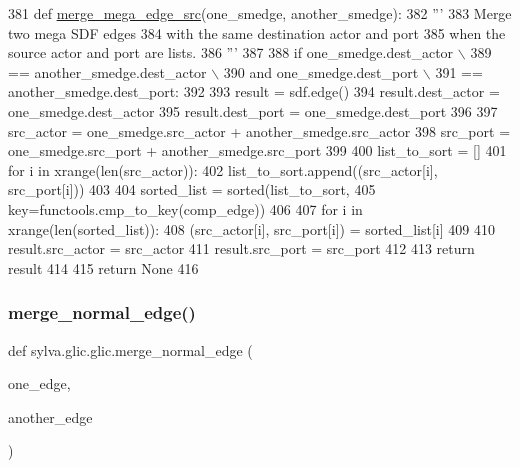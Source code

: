 \begin{DoxyCode}
381     \textcolor{keyword}{def }\hyperlink{namespacesylva_1_1glic_1_1glic_aa4a9eb6227bd109eec96e5c1ad6579c5}{merge\_mega\_edge\_src}(one\_smedge, another\_smedge):
382         \textcolor{stringliteral}{'''}
383 \textcolor{stringliteral}{          Merge two mega SDF edges}
384 \textcolor{stringliteral}{          with the same destination actor and port}
385 \textcolor{stringliteral}{          when the source actor and port are lists.}
386 \textcolor{stringliteral}{        '''}
387 
388         \textcolor{keywordflow}{if} one\_smedge.dest\_actor \(\backslash\)
389                 == another\_smedge.dest\_actor \(\backslash\)
390                 \textcolor{keywordflow}{and} one\_smedge.dest\_port \(\backslash\)
391                 == another\_smedge.dest\_port:
392 
393             result = sdf.edge()
394             result.dest\_actor = one\_smedge.dest\_actor
395             result.dest\_port = one\_smedge.dest\_port
396 
397             src\_actor = one\_smedge.src\_actor + another\_smedge.src\_actor
398             src\_port = one\_smedge.src\_port + another\_smedge.src\_port
399 
400             list\_to\_sort = []
401             \textcolor{keywordflow}{for} i \textcolor{keywordflow}{in} xrange(len(src\_actor)):
402                 list\_to\_sort.append((src\_actor[i], src\_port[i]))
403 
404             sorted\_list = sorted(list\_to\_sort,
405                                  key=functools.cmp\_to\_key(comp\_edge))
406 
407             \textcolor{keywordflow}{for} i \textcolor{keywordflow}{in} xrange(len(sorted\_list)):
408                 (src\_actor[i], src\_port[i]) = sorted\_list[i]
409 
410             result.src\_actor = src\_actor
411             result.src\_port = src\_port
412 
413             \textcolor{keywordflow}{return} result
414 
415         \textcolor{keywordflow}{return} \textcolor{keywordtype}{None}
416 
\end{DoxyCode}
\mbox{\label{namespacesylva_1_1glic_1_1glic_a1d03fa1322fc331579ff650ea5612ce8}} 
\subsubsection{\texorpdfstring{merge\+\_\+normal\+\_\+edge()}{merge\_normal\_edge()}}
{\footnotesize\ttfamily def sylva.\+glic.\+glic.\+merge\+\_\+normal\+\_\+edge (\begin{DoxyParamCaption}\item[{}]{one\+\_\+edge,  }\item[{}]{another\+\_\+edge }\end{DoxyParamCaption})}

